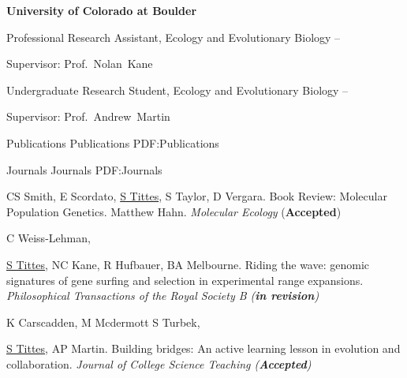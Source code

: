 \documentclass[letterpaper,MMMyyyy,nonstopmode]{simpleresumecv}
\begin{document}
\begin{Body}
\Entry
{\textbf{University of Colorado at Boulder}}

\Gap
\BulletItem
Professional Research Assistant, Ecology and Evolutionary Biology
\hfill
{} --
\begin{Detail}
Supervisor:
Prof.~Nolan~Kane
\end{Detail}

\Entry

\Gap
\BulletItem
Undergraduate Research Student, Ecology and Evolutionary Biology
\hfill
{} --
\begin{Detail}
Supervisor:
Prof.~Andrew~Martin
\end{Detail}


\Section
{Publications}
{Publications}
{PDF:Publications}

\SubSection
{Journals}
{Journals}
{PDF:Journals}

\begingroup
\renewcommand{\MaxNumberedItem}{[300]}


\Gap
\NumberedItem{[11]}
CS Smith, E Scordato, \underline{S Tittes}, S Taylor, D Vergara.
Book Review: Molecular Population Genetics. Matthew Hahn.
\textit{Molecular Ecology} (\textbf{Accepted})

\Gap
\NumberedItem{[10]}
C Weiss-Lehman, {\underline{S Tittes}, NC Kane, R Hufbauer, BA Melbourne.
Riding the wave: genomic signatures of gene surfing and selection in experimental range expansions.
\textit{Philosophical Transactions of the Royal Society B (\textbf{in revision})}

\Gap
\NumberedItem{[9]}
K Carscadden, M Mcdermott S Turbek, {\underline{S Tittes}, AP Martin.
Building bridges: An active learning lesson in evolution and collaboration.
\textit{Journal of College Science Teaching (\textbf{Accepted})}


}}
\end{Body}
\end{document}
